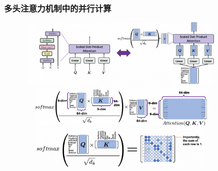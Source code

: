 \begin{frame}
    \frametitle{多头注意力机制中的并行计算}
\begin{figure}[h!]
\vspace*{-0.15in}
\centering
\includegraphics[height=1.3in, width=4.0in, viewport=0 0 800 300,clip]{Figures/MHA-scaled_dot_product.png}
\includegraphics[height=0.8in, width=4.0in, viewport=0 0 800 193,clip]{Figures/MHA-scaled_dot_attention.png}
\includegraphics[height=0.8in, width=4.0in, viewport=0 0 800 200,clip]{Figures/MHA-self_attention_map.png}
\label{Transformer_multiHead}
\end{figure}
\end{frame}

